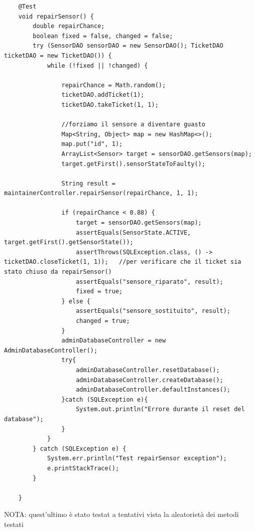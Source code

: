 \documentclass[a4paper, 11pt]{article}
\begin{document}
\begin{lstlisting}
    @Test
    void repairSensor() {
        double repairChance;
        boolean fixed = false, changed = false;
        try (SensorDAO sensorDAO = new SensorDAO(); TicketDAO ticketDAO = new TicketDAO()) {
            while (!fixed || !changed) {

                repairChance = Math.random();
                ticketDAO.addTicket(1);
                ticketDAO.takeTicket(1, 1);

                //forziamo il sensore a diventare guasto
                Map<String, Object> map = new HashMap<>();
                map.put("id", 1);
                ArrayList<Sensor> target = sensorDAO.getSensors(map);
                target.getFirst().sensorStateToFaulty();

                String result = maintainerController.repairSensor(repairChance, 1, 1);

                if (repairChance < 0.88) {
                    target = sensorDAO.getSensors(map);
                    assertEquals(SensorState.ACTIVE, target.getFirst().getSensorState());
                    assertThrows(SQLException.class, () -> ticketDAO.closeTicket(1, 1));   //per verificare che il ticket sia stato chiuso da repairSensor()
                    assertEquals("sensore_riparato", result);
                    fixed = true;
                } else {
                    assertEquals("sensore_sostituito", result);
                    changed = true;
                }
                adminDatabaseController = new AdminDatabaseController();
                try{
                    adminDatabaseController.resetDatabase();
                    adminDatabaseController.createDatabase();
                    adminDatabaseController.defaultInstances();
                }catch (SQLException e){
                    System.out.println("Errore durante il reset del database");
                }
            }
        } catch (SQLException e) {
            System.err.println("Test repairSensor exception");
            e.printStackTrace();
        }

    }
	\end{lstlisting}
	NOTA: quest'ultimo è stato testat a tentativi vista la aleatorietà dei metodi testati
\end{document}

